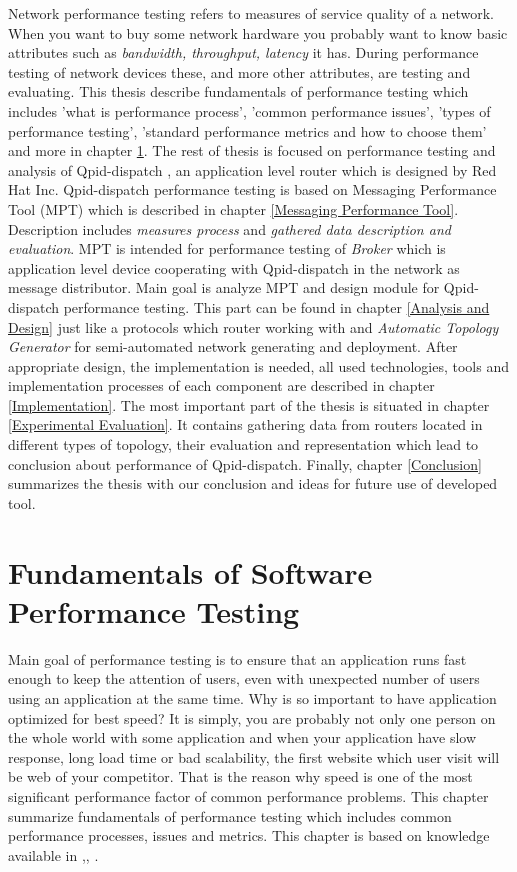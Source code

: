 Network performance testing refers to measures of service quality of a network. When you want to buy some network hardware you probably want to know basic attributes such as \emph{bandwidth, throughput, latency} it has. During performance testing of network devices these, and more other attributes, are testing and evaluating. This thesis describe fundamentals of performance testing which includes 'what is performance process', 'common performance issues', 'types of performance testing', 'standard performance metrics and how to choose them' and more in chapter \ref{Fundamentals of Software Performance Testing}. The rest of thesis is focused on performance testing and analysis of Qpid-dispatch \cite{RH:Interconnect}, an application level router which is designed by Red Hat Inc. Qpid-dispatch performance testing is based on Messaging Performance Tool (MPT)\cite{ORPISKE:MSGPT} which is described in chapter \ref{Messaging Performance Tool}. Description includes \emph{measures process} and \emph{gathered data description and evaluation}. MPT is intended for performance testing of \emph{Broker}\cite{RH:Broker} which is application level device cooperating with Qpid-dispatch in the network as message distributor. Main goal is analyze MPT and design module for Qpid-dispatch performance testing. This part can be found in chapter \ref{Analysis and Design} just like a protocols which router working with and \emph{Automatic Topology Generator} for semi-automated network generating and deployment. After appropriate design, the implementation is needed, all used technologies, tools and  implementation processes of each component are described in chapter \ref{Implementation}. The most important part of the thesis is situated in chapter \ref{Experimental Evaluation}. It contains gathering data from routers located in different types of topology, their evaluation and representation which lead to conclusion about performance of Qpid-dispatch. Finally, chapter \ref{Conclusion} summarizes the thesis with our conclusion  and ideas for future use of developed tool.


\chapter{Fundamentals of Software Performance Testing}
\label{Fundamentals of Software Performance Testing}
Main goal of performance testing is to ensure that an application runs fast enough to keep the attention of users, even with unexpected number of users using an application at the same time. Why is so important to have application optimized for best speed? It is simply, you are probably not only one person on the whole world with some application and when your application have slow response, long load time or bad scalability, the first website which user visit will be web of your competitor. That is the reason why speed is one of the most significant performance factor of common performance problems. This chapter summarize fundamentals of performance testing which includes common performance processes, issues and metrics. This chapter is based on knowledge available in \cite{Molyneaux:TAoAPT},\cite{Kurkova:Thesis:2017}, \cite{DIN:PHD}.


